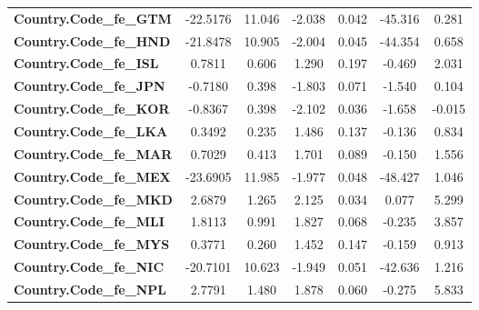 \begin{center}
\begin{tabular}{lcccccc}
\textbf{Country.Code\_fe\_GTM}                            &     -22.5176  &       11.046     &    -2.038  &         0.042        &      -45.316    &        0.281     \\
\textbf{Country.Code\_fe\_HND}                            &     -21.8478  &       10.905     &    -2.004  &         0.045        &      -44.354    &        0.658     \\
\textbf{Country.Code\_fe\_ISL}                            &       0.7811  &        0.606     &     1.290  &         0.197        &       -0.469    &        2.031     \\
\textbf{Country.Code\_fe\_JPN}                            &      -0.7180  &        0.398     &    -1.803  &         0.071        &       -1.540    &        0.104     \\
\textbf{Country.Code\_fe\_KOR}                            &      -0.8367  &        0.398     &    -2.102  &         0.036        &       -1.658    &       -0.015     \\
\textbf{Country.Code\_fe\_LKA}                            &       0.3492  &        0.235     &     1.486  &         0.137        &       -0.136    &        0.834     \\
\textbf{Country.Code\_fe\_MAR}                            &       0.7029  &        0.413     &     1.701  &         0.089        &       -0.150    &        1.556     \\
\textbf{Country.Code\_fe\_MEX}                            &     -23.6905  &       11.985     &    -1.977  &         0.048        &      -48.427    &        1.046     \\
\textbf{Country.Code\_fe\_MKD}                            &       2.6879  &        1.265     &     2.125  &         0.034        &        0.077    &        5.299     \\
\textbf{Country.Code\_fe\_MLI}                            &       1.8113  &        0.991     &     1.827  &         0.068        &       -0.235    &        3.857     \\
\textbf{Country.Code\_fe\_MYS}                            &       0.3771  &        0.260     &     1.452  &         0.147        &       -0.159    &        0.913     \\
\textbf{Country.Code\_fe\_NIC}                            &     -20.7101  &       10.623     &    -1.949  &         0.051        &      -42.636    &        1.216     \\
\textbf{Country.Code\_fe\_NPL}                            &       2.7791  &        1.480     &     1.878  &         0.060        &       -0.275    &        5.833     \\

\end{tabular}
\end{center}
